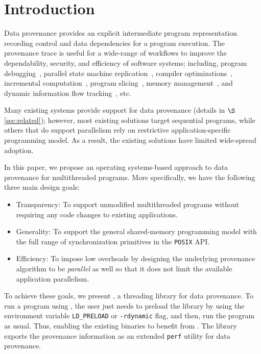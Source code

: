 \section{Introduction}
\label{sec:introduction}

Data provenance provides an explicit intermediate program representation recording control and data dependencies for a program execution.  The provenance trace is useful for a wide-range of workflows to improve the dependability, security, and efficiency of software systems; including, program debugging~\cite{fast-track-pldi}, parallel state machine replication~\cite{rex},  compiler optimizations~\cite{pgo}, incremental computation~\cite{ithreads}, program slicing~\cite{roly}, memory management~\cite{memprof}, and dynamic information flow tracking~\cite{dift}, etc. 

Many existing systems provide support for data provenance (details in $\S$\ref{sec:related}); however,
most existing solutions target sequential programs, while others that do support parallelism rely on restrictive application-specific programming model. As a result, the existing solutions have limited wide-spread adoption.



In this paper, we propose an operating systems-based approach to data provenance for multithreaded programs. More specifically, we have the following three main design goals: 
\begin{itemize} 

\item Transparency: To support unmodified multithreaded programs without requiring any code changes to existing applications. 
\item Generality: To support the general shared-memory programming model with the  full range of synchronization primitives in the {\tt POSIX} API. 
\item Efficiency: To impose low overheads by designing the underlying provenance algorithm to be  {\em parallel} as well so that it does not limit the available application parallelism.

\end{itemize}

To achieve these goals, we present \projecttitle, a threading library for data provenance. To run a program using \projecttitle,  the user just needs to preload the \projecttitle library  by using the environment variable {\tt LD\_PRELOAD} or {\tt -rdynamic} flag, and then, run the program as usual. Thus, enabling the existing binaries to benefit from \projecttitle. The library exports the provenance information as an extended  {\tt perf} utility for data provenance. 


